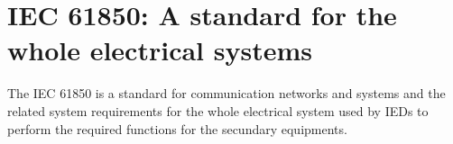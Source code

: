 \section{IEC 61850: A standard for the whole electrical systems}

The IEC 61850 is a standard for communication networks and systems 
and the related system requirements for the whole electrical system
used by \Glspl{IED} to perform 
the required functions for the secundary equipments.

